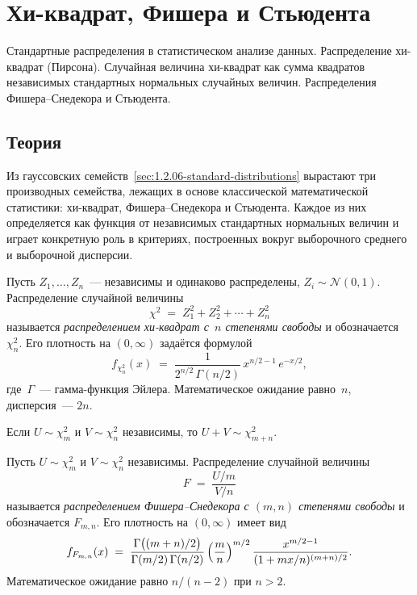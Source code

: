 
\section{Хи-квадрат, Фишера и Стьюдента}
\label{sec:1.2.10-chi2-f-student}

\begin{ticket}
Стандартные распределения в статистическом анализе данных. Распределение хи-квадрат (Пирсона). Случайная величина хи-квадрат как сумма квадратов независимых стандартных нормальных случайных величин. Распределения Фишера–Снедекора и Стьюдента.
\end{ticket}

\subsection*{Теория}

Из гауссовских семейств~\cref{sec:1.2.06-standard-distributions} вырастают три производных семейства, лежащих в основе классической математической статистики: хи-квадрат, Фишера--Снедекора и Стьюдента. Каждое из них определяется как функция от независимых стандартных нормальных величин и играет конкретную роль в критериях, построенных вокруг выборочного среднего и выборочной дисперсии.

\begin{definition}
\label{def:chi-squared}
Пусть $Z_1, \dots, Z_n$~--- независимы и одинаково распределены, $Z_i \sim \mathcal{N}(0, 1)$. Распределение случайной величины
\[
  \chi^2 \;=\; Z_1^2 + Z_2^2 + \cdots + Z_n^2
\]
называется \emph{распределением хи-квадрат с~$n$ степенями свободы} и обозначается $\chi^2_n$. Его плотность на $(0, \infty)$ задаётся формулой
\[
  f_{\chi^2_n}(x) \;=\; \frac{1}{2^{n/2}\, \Gamma(n/2)}\, x^{n/2 - 1}\, e^{-x/2},
\]
где~$\Gamma$~--- гамма-функция Эйлера. Математическое ожидание равно~$n$, дисперсия~--- $2n$.
\end{definition}

\begin{proposition}
\label{prop:chi2-closure}
Если $U \sim \chi^2_m$ и $V \sim \chi^2_n$ независимы, то $U + V \sim \chi^2_{m+n}$.
\end{proposition}

\begin{definition}
\label{def:f-distribution}
Пусть $U \sim \chi^2_m$ и $V \sim \chi^2_n$ независимы. Распределение случайной величины
\[
  F \;=\; \frac{U / m}{V / n}
\]
называется \emph{распределением Фишера--Снедекора с $(m, n)$ степенями свободы} и обозначается $F_{m, n}$. Его плотность на $(0, \infty)$ имеет вид
\[
  f_{F_{m,n}}(x) \;=\; \frac{\Gamma\bigl((m+n)/2\bigr)}{\Gamma(m/2)\, \Gamma(n/2)}\, \Bigl(\frac{m}{n}\Bigr)^{m/2}\, \frac{x^{m/2 - 1}}{(1 + m x/n)^{(m+n)/2}}.
\]
Математическое ожидание равно $n/(n - 2)$ при $n > 2$.
\end{definition}

